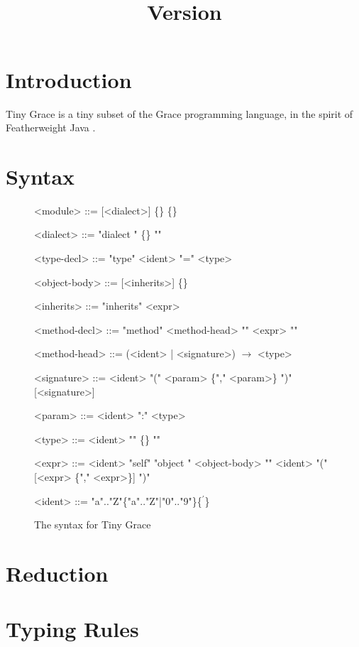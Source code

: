 \documentclass[a4paper, 11pt]{article}
\title{\thetitle\\\normalsize\vspace{0.5em}Version \version\vspace{-0.5em}}
\author{\theauthor}
\def\name{Tiny Grace }
\begin{document}
\maketitle\vspace{-2em}

\section{Introduction}

\name is a tiny subset of the Grace programming language, in the spirit of
Featherweight Java \cite{fj}.


\section{Syntax}

\begin{figure}[h]

\begin{grammar}
<module> ::= [<dialect>] \{<type-decl>\} \{<method-decl>\}

<dialect> ::= "dialect {" \{<method-decl>\} "}"

<type-decl> ::= "type" <ident> "=" <type>

<object-body> ::= [<inherits>] \{<method-decl>\}

<inherits> ::= "inherits" <expr>

<method-decl> ::= "method" <method-head> "{" <expr> "}"

<method-head> ::= (<ident> | <signature>) $\to$ <type>

<signature> ::= <ident> "(" <param> \{"," <param>\} ")" [<signature>]

<param> ::= <ident> ":" <type>

<type> ::= <ident>
    \alt "{" \{<method-head>\} "}"

<expr> ::= <ident>
    \alt "self"
    \alt "object {" <object-body> "}"
    \alt [<expr> "."] <ident> "(" [<expr> \{"," <expr>\}] ")"

<ident> ::= "a".."Z"\{"a".."Z"|"0".."9"\}\{$^\prime$\}
\end{grammar}

\label{fig:syntax}
\caption{The syntax for \name}

\end{figure}


\section{Reduction}


\section{Typing Rules}



\end{document}
